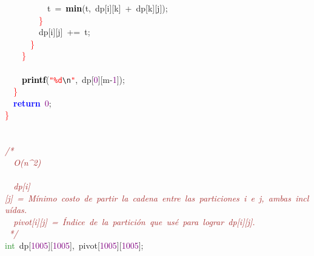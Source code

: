 {{\mbox{}\ \ \ \ \ \ \ \ \ \ t\ \textcolor{BrickRed}{=}\ \textbf{\textcolor{Black}{min}}\textcolor{BrickRed}{(}t\textcolor{BrickRed}{,}\ dp\textcolor{BrickRed}{[}i\textcolor{BrickRed}{][}k\textcolor{BrickRed}{]}\ \textcolor{BrickRed}{+}\ dp\textcolor{BrickRed}{[}k\textcolor{BrickRed}{][}j\textcolor{BrickRed}{]);} \\
\mbox{}\ \ \ \ \ \ \ \ \textcolor{Red}{\}} \\
\mbox{}\ \ \ \ \ \ \ \ dp\textcolor{BrickRed}{[}i\textcolor{BrickRed}{][}j\textcolor{BrickRed}{]}\ \textcolor{BrickRed}{+=}\ t\textcolor{BrickRed}{;} \\
\mbox{}\ \ \ \ \ \ \textcolor{Red}{\}} \\
\mbox{}\ \ \ \ \textcolor{Red}{\}} \\
\mbox{} \\
\mbox{}\ \ \ \ \textbf{\textcolor{Black}{printf}}\textcolor{BrickRed}{(}\texttt{\textcolor{Red}{"{}\%d}}\texttt{\textcolor{CarnationPink}{\textbackslash{}n}}\texttt{\textcolor{Red}{"{}}}\textcolor{BrickRed}{,}\ dp\textcolor{BrickRed}{[}\textcolor{Purple}{0}\textcolor{BrickRed}{][}m\textcolor{BrickRed}{-}\textcolor{Purple}{1}\textcolor{BrickRed}{]);} \\
\mbox{}\ \ \textcolor{Red}{\}} \\
\mbox{}\ \ \textbf{\textcolor{Blue}{return}}\ \textcolor{Purple}{0}\textcolor{BrickRed}{;} \\
\mbox{}\textcolor{Red}{\}} \\
\mbox{} \\
\mbox{} \\
\mbox{}\textit{\textcolor{Brown}{/*}} \\
\mbox{}\textit{\textcolor{Brown}{\ \ O(n\textasciicircum{}2)}} \\
\mbox{} \\
\mbox{}\textit{\textcolor{Brown}{\ \ dp[i][j]\ =\ Mínimo\ costo\ de\ partir\ la\ cadena\ entre\ las\ particiones\ i\ e\ j,\ ambas\ incluídas.}} \\
\mbox{}\textit{\textcolor{Brown}{\ \ pivot[i][j]\ =\ Índice\ de\ la\ partición\ que\ usé\ para\ lograr\ dp[i][j].}} \\
\mbox{}\textit{\textcolor{Brown}{\ */}} \\
\mbox{}\textcolor{ForestGreen}{int}\ dp\textcolor{BrickRed}{[}\textcolor{Purple}{1005}\textcolor{BrickRed}{][}\textcolor{Purple}{1005}\textcolor{BrickRed}{],}\ pivot\textcolor{BrickRed}{[}\textcolor{Purple}{1005}\textcolor{BrickRed}{][}\textcolor{Purple}{1005}\textcolor{BrickRed}{];} \\
}}
